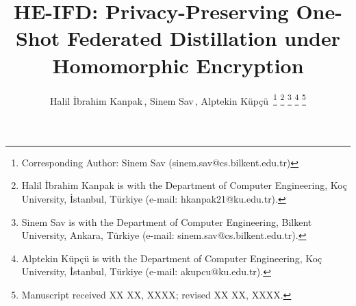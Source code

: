 \documentclass[lettersize,journal]{IEEEtran}
\begin{document}

\title{HE-IFD: Privacy-Preserving One-Shot Federated Distillation under Homomorphic Encryption}






\author{
Halil \.{I}brahim Kanpak\,,
 Sinem Sav\,,
Alptekin K\"up\c{c}\"u\,%
\thanks{Corresponding Author: Sinem Sav (sinem.sav@cs.bilkent.edu.tr)}
\thanks{Halil \.{I}brahim Kanpak is with the Department of Computer Engineering, Ko\c{c} University, İstanbul, Türkiye (e-mail: hkanpak21@ku.edu.tr).}%
\thanks{Sinem Sav is with the Department of Computer Engineering, Bilkent University, Ankara, Türkiye (e-mail: sinem.sav@cs.bilkent.edu.tr).}%
\thanks{Alptekin K\"up\c{c}\"u is with the Department of Computer Engineering, Ko\c{c} University, İstanbul, Türkiye (e-mail: akupcu@ku.edu.tr).}%
\thanks{Manuscript received XX XX, XXXX; revised XX XX, XXXX.}%
}



\maketitle
\end{document}
